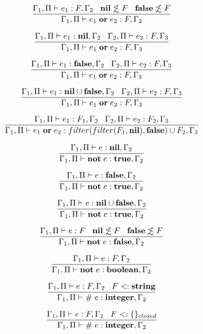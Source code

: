 \[
\dfrac{\Gamma_{1}, \Pi \vdash e_{1}:F, \Gamma_{2} \;\;\;
       \mathbf{nil} \not\lesssim F \;\;\;
       \mathbf{false} \not\lesssim F}
      {\Gamma_{1}, \Pi \vdash e_{1} \; \mathbf{or} \; e_{2}:F, \Gamma_{2}}
\]

\[
\dfrac{\Gamma_{1}, \Pi \vdash e_{1}:\mathbf{nil}, \Gamma_{2} \;\;\;
       \Gamma_{2}, \Pi \vdash e_{2}:F, \Gamma_{3}}
      {\Gamma_{1}, \Pi \vdash e_{1} \; \mathbf{or} \; e_{2}:F, \Gamma_{3}}
\]

\[
\dfrac{\Gamma_{1}, \Pi \vdash e_{1}:\mathbf{false}, \Gamma_{2} \;\;\;
       \Gamma_{2}, \Pi \vdash e_{2}:F, \Gamma_{3}}
      {\Gamma_{1}, \Pi \vdash e_{1} \; \mathbf{or} \; e_{2}:F, \Gamma_{3}}
\]

\[
\dfrac{\Gamma_{1}, \Pi \vdash e_{1}:\mathbf{nil} \cup \mathbf{false}, \Gamma_{2} \;\;\;
       \Gamma_{2}, \Pi \vdash e_{2}:F, \Gamma_{3}}
      {\Gamma_{1}, \Pi \vdash e_{1} \; \mathbf{or} \; e_{2}:F, \Gamma_{3}}
\]

\[
\dfrac{\Gamma_{1}, \Pi \vdash e_{1}:F_{1}, \Gamma_{2} \;\;\;
       \Gamma_{2}, \Pi \vdash e_{2}:F_{2}, \Gamma_{3}}
      {\Gamma_{1}, \Pi \vdash e_{1} \; \mathbf{or} \; e_{2}:filter(filter(F_{1}, \mathbf{nil}), \mathbf{false}) \cup F_{2}, \Gamma_{3}}
\]

\[
\dfrac{\Gamma_{1}, \Pi \vdash e:\mathbf{nil}, \Gamma_{2}}
      {\Gamma_{1}, \Pi \vdash \mathbf{not} \; e:\mathbf{true}, \Gamma_{2}}
\]

\[
\dfrac{\Gamma_{1}, \Pi \vdash e:\mathbf{false}, \Gamma_{2}}
      {\Gamma_{1}, \Pi \vdash \mathbf{not} \; e:\mathbf{true}, \Gamma_{2}}
\]

\[
\dfrac{\Gamma_{1}, \Pi \vdash e:\mathbf{nil} \cup \mathbf{false}, \Gamma_{2}}
      {\Gamma_{1}, \Pi \vdash \mathbf{not} \; e:\mathbf{true}, \Gamma_{2}}
\]

\[
\dfrac{\Gamma_{1}, \Pi \vdash e:F \;\;\;
       \mathbf{nil} \not\lesssim F \;\;\;
       \mathbf{false} \not\lesssim F}
      {\Gamma_{1}, \Pi \vdash \mathbf{not} \; e:\mathbf{false}, \Gamma_{2}}
\]

\[
\dfrac{\Gamma_{1}, \Pi \vdash e:F, \Gamma_{2}}
      {\Gamma_{1}, \Pi \vdash \mathbf{not} \; e:\mathbf{boolean}, \Gamma_{2}}
\]

\[
\dfrac{\Gamma_{1}, \Pi \vdash e:F, \Gamma_{2} \;\;\;
       F <: \mathbf{string}}
      {\Gamma_{1}, \Pi \vdash \# \; e:\mathbf{integer}, \Gamma_{2}}
\]

\[
\dfrac{\Gamma_{1}, \Pi \vdash e:F, \Gamma_{2} \;\;\;
       F <: \{\}_{closed}}
      {\Gamma_{1}, \Pi \vdash \# \; e:\mathbf{integer}, \Gamma_{2}}
\]

